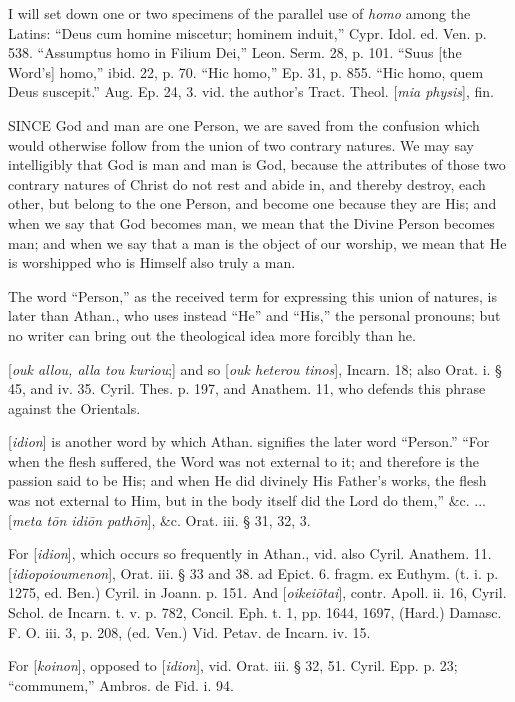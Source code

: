I will set down one or two specimens of the
parallel use of \emph{homo} among the Latins: ``Deus cum homine
miscetur; hominem induit,'' Cypr. Idol. ed. Ven. p. 538. ``Assumptus
homo in Filium Dei,'' Leon. Serm. 28, p. 101. ``Suus [the Word's] homo,''
ibid. 22, p. 70. ``Hic homo,'' Ep. 31, p. 855. ``Hic homo, quem Deus
suscepit.'' Aug. Ep. 24, 3. vid. the author's Tract. Theol. [\emph{mia
physis}], fin.


SINCE
God and man are one Person, we are saved from the confusion which
would otherwise follow from the union of two contrary natures. We may
say intelligibly that God is man and man is God, because the
attributes of those two contrary natures of Christ do not rest and
abide in, and thereby destroy, each other, but belong to the one
Person, and become one because they are His; and when we say that God
becomes man, we mean that the Divine Person becomes man; and when we
say that a man is the object of our worship, we mean that He is
worshipped who is Himself also truly a man.

The word ``Person,'' as the received term for
expressing this union of natures, is later than Athan., who uses
instead ``He'' and ``His,'' the personal pronouns; but no writer can bring
out the theological idea more forcibly than he.

[\emph{ouk allou, alla tou kuriou};] and so [\emph{ouk
heterou tinos}], Incarn. 18; also Orat. i. § 45, and iv. 35.
Cyril. Thes. p. 197, and Anathem. 11, who defends this phrase against
the Orientals.

[\emph{idion}] is another word by which Athan.
signifies the later word ``Person.'' ``For when the flesh suffered, the
Word was not external to it; and therefore is the passion said to be
His; and when He did divinely His Father's works, the flesh was
not external to Him, but in the body itself did the Lord do them,''
\&c. ... [\emph{meta t\={o}n idi\={o}n path\={o}n}],
\&c. Orat. iii. § 31, 32, 3.

For [\emph{idion}], which occurs so frequently in
Athan., vid. also Cyril. Anathem. 11. [\emph{idiopoioumenon}], Orat.
iii. § 33 and 38. ad Epict. 6. fragm. ex Euthym. (t. i. p. 1275, ed.
Ben.) Cyril. in Joann. p. 151. And [\emph{oikei\={o}tai}], contr.
Apoll. ii. 16, Cyril. Schol. de Incarn. t. v. p. 782, Concil. Eph. t.
1, pp. 1644, 1697, (Hard.) Damasc. F. O. iii. 3, p. 208, (ed. Ven.)
Vid. Petav. de Incarn. iv. 15.

For [\emph{koinon}], opposed to [\emph{idion}],
vid. Orat. iii. § 32, 51. Cyril. Epp. p. 23; ``communem,'' Ambros. de
Fid. i. 94.

